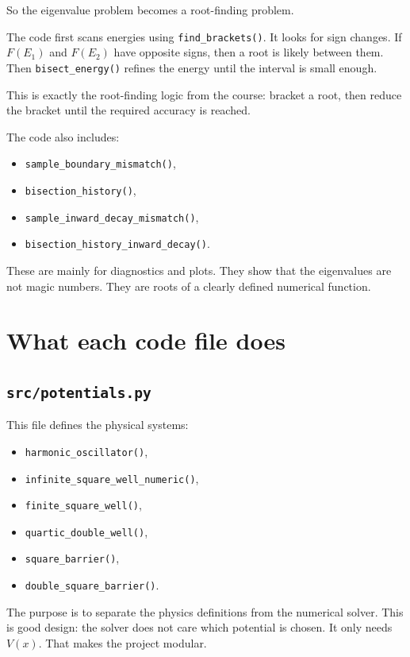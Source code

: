 \documentclass[11pt]{article}
\begin{document}
    So the eigenvalue problem becomes a root-finding problem.

    The code first scans energies using \texttt{find\_brackets()}. It looks for sign changes. If $F(E_1)$ and $F(E_2)$ have opposite signs, then a root is likely between them. Then \texttt{bisect\_energy()} refines the energy until the interval is small enough.

    This is exactly the root-finding logic from the course: bracket a root, then reduce the bracket until the required accuracy is reached.

    The code also includes:
    \begin{itemize}
        \item \texttt{sample\_boundary\_mismatch()},
        \item \texttt{bisection\_history()},
        \item \texttt{sample\_inward\_decay\_mismatch()},
        \item \texttt{bisection\_history\_inward\_decay()}.
    \end{itemize}

    These are mainly for diagnostics and plots. They show that the eigenvalues are not magic numbers. They are roots of a clearly defined numerical function.

    \section{What each code file does}

    \subsection{\texttt{src/potentials.py}}

    This file defines the physical systems:
    \begin{itemize}
        \item \texttt{harmonic\_oscillator()},
        \item \texttt{infinite\_square\_well\_numeric()},
        \item \texttt{finite\_square\_well()},
        \item \texttt{quartic\_double\_well()},
        \item \texttt{square\_barrier()},
        \item \texttt{double\_square\_barrier()}.
    \end{itemize}

    The purpose is to separate the physics definitions from the numerical solver. This is good design: the solver does not care which potential is chosen. It only needs $V(x)$. That makes the project modular.
\end{document}
